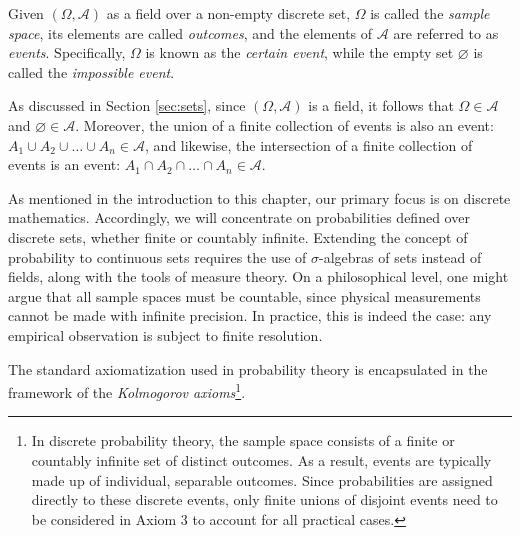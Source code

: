 \begin{definition}
Given $\left( \Omega, \mathcal{A} \right)$ as a field over a non-empty discrete set, $\Omega$ is called the \emph{sample space}, its elements are called \emph{outcomes}, and the elements of $\mathcal{A}$ are referred to as \emph{events}. Specifically, $\Omega$ is known as the \emph{certain event}, while the empty set $\varnothing$ is called the \emph{impossible event}.
\end{definition}

As discussed in Section \ref{sec:sets}, since $\left( \Omega, \mathcal{A} \right)$ is a field, it follows that $\Omega \in \mathcal{A}$ and $\varnothing \in \mathcal{A}$. Moreover, the union of a finite collection of events is also an event: $A_1 \cup A_2 \cup \ldots \cup A_n \in \mathcal{A}$, and likewise, the intersection of a finite collection of events is an event: $A_1 \cap A_2 \cap \ldots \cap A_n \in \mathcal{A}$.

As mentioned in the introduction to this chapter, our primary focus is on discrete mathematics. Accordingly, we will concentrate on probabilities defined over discrete sets, whether finite or countably infinite. Extending the concept of probability to continuous sets requires the use of $\sigma$-algebras of sets instead of fields, along with the tools of measure theory. On a philosophical level, one might argue that all sample spaces must be countable, since physical measurements cannot be made with infinite precision. In practice, this is indeed the case: any empirical observation is subject to finite resolution.

The standard axiomatization used in probability theory is encapsulated in the framework of the \emph{Kolmogorov axioms}\footnote{In discrete probability theory, the sample space consists of a finite or countably infinite set of distinct outcomes. As a result, events are typically made up of individual, separable outcomes. Since probabilities are assigned directly to these discrete events, only finite unions of disjoint events need to be considered in Axiom 3 to account for all practical cases.}.

